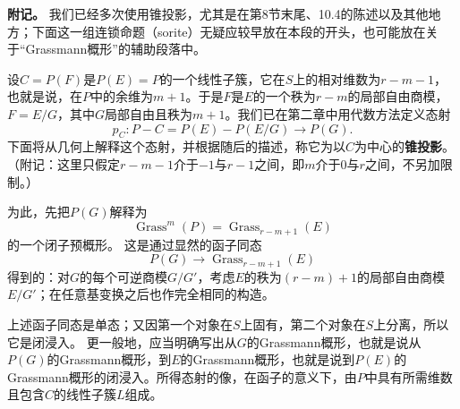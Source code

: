 
\noindent\textbf{附记。}
我们已经多次使用锥投影，尤其是在第8节末尾、10.4的陈述以及其他地方；下面这一组连锁命题（sorite）无疑应较早放在本段的开头，也可能放在关于“Grassmann概形”的辅助段落中。

设$C=P(F)$是$P(E)=P$的一个线性子簇，它在$S$上的相对维数为$r-m-1$，也就是说，在$P$中的余维为$m+1$。于是$F$是$E$的一个秩为$r-m$的局部自由商模，$F=E/G$，其中$G$局部自由且秩为$m+1$。我们已在第二章中用代数方法定义态射
\[
p_C:P-C=P(E)-P(E/G)\longrightarrow P(G).
\]
下面将从几何上解释这个态射，并根据随后的描述，称它为以$C$为中心的\textbf{锥投影}。（附记：这里只假定$r-m-1$介于$-1$与$r-1$之间，即$m$介于$0$与$r$之间，不另加限制。）

为此，先把$P(G)$解释为
\[
\operatorname{Grass}^{m}(P)
 =\operatorname{Grass}_{r-m+1}(E)
\]
的一个闭子预概形。
这是通过显然的函子同态
\[
P(G)\longrightarrow\operatorname{Grass}_{r-m+1}(E)
\]
得到的：对$G$的每个可逆商模$G/G'$，考虑$E$的秩为$(r-m)+1$的局部自由商模$E/G'$；在任意基变换之后也作完全相同的构造。

上述函子同态是单态；又因第一个对象在$S$上固有，第二个对象在$S$上分离，所以它是闭浸入。
更一般地，应当明确写出从$G$的Grassmann概形，也就是说从$P(G)$的Grassmann概形，到$E$的Grassmann概形，也就是说到$P(E)$的Grassmann概形的闭浸入。所得态射的像，在函子的意义下，由$P$中具有所需维数且包含$C$的线性子簇$L$组成。

